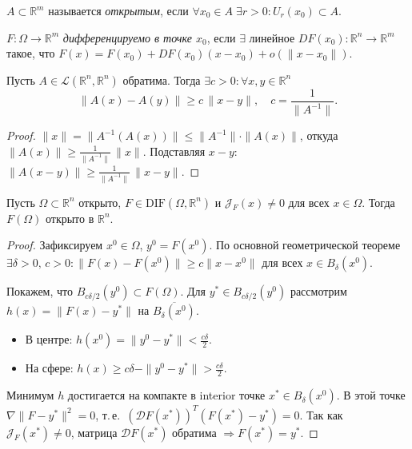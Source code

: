 


\begin{defn}
  $A \subset \mathbb{R}^m$ называется \emph{открытым}, если $\forall x_0 \in A\;\exists r>0: U_r(x_0) \subset A$.
\end{defn}

\begin{defn}
  $F: \Omega \to \mathbb{R}^m$ \emph{дифференцируемо в точке $x_0$}, если $\exists$ линейное
  $DF(x_0): \mathbb{R}^n \to \mathbb{R}^m$ такое, что
  $F(x) = F(x_0) + DF(x_0)(x-x_0) + o(\|x-x_0\|)$.
\end{defn}

\begin{lemma}
  Пусть $A \in \mathcal{L}(\mathbb{R}^n, \mathbb{R}^n)$ обратима. Тогда
  $\exists c > 0: \forall x,y \in \mathbb{R}^n$
  \[
    \|A(x) - A(y)\| \geq c\,\|x - y\|, \quad c = \frac{1}{\|A^{-1}\|}.
  \]
  \begin{proof}
    $\|x\| = \|A^{-1}(A(x))\| \leq \|A^{-1}\|\cdot\|A(x)\|$, откуда
    $\|A(x)\| \geq \tfrac{1}{\|A^{-1}\|}\,\|x\|$.
    Подставляя $x - y$: $\|A(x-y)\| \geq \tfrac{1}{\|A^{-1}\|}\,\|x-y\|$. \qedhere
  \end{proof}
\end{lemma}

\begin{theorem}
  Пусть $\Omega \subset \mathbb{R}^n$ открыто, $F \in \mathrm{DIF}(\Omega, \mathbb{R}^n)$
  и $\mathcal{J}_F(x) \neq 0$ для всех $x \in \Omega$. Тогда $F(\Omega)$ открыто в $\mathbb{R}^n$.
  \begin{proof}
    Зафиксируем $x^0 \in \Omega$, $y^0 = F(x^0)$. По основной геометрической теореме
    $\exists\delta > 0,\, c > 0: \|F(x)-F(x^0)\| \geq c\|x-x^0\|$
    для всех $x \in B_\delta(x^0)$.

    Покажем, что $B_{c\delta/2}(y^0) \subset F(\Omega)$.
    Для $y^* \in B_{c\delta/2}(y^0)$ рассмотрим $h(x) = \|F(x)-y^*\|$ на $\overline{B_\delta(x^0)}$.

    \begin{itemize}
      \item В центре: $h(x^0) = \|y^0 - y^*\| < \tfrac{c\delta}{2}$.
      \item На сфере: $h(x) \geq c\delta - \|y^0-y^*\| > \tfrac{c\delta}{2}$.
    \end{itemize}

    Минимум $h$ достигается на компакте в interior точке $x^* \in B_\delta(x^0)$.
    В этой точке $\nabla\|F-y^*\|^2 = 0$, т.\,е.\ $(\mathcal{D}F(x^*))^T (F(x^*)-y^*) = 0$.
    Так как $\mathcal{J}_F(x^*) \neq 0$, матрица $\mathcal{D}F(x^*)$ обратима $\Rightarrow F(x^*) = y^*$. \qedhere
  \end{proof}
\end{theorem}

